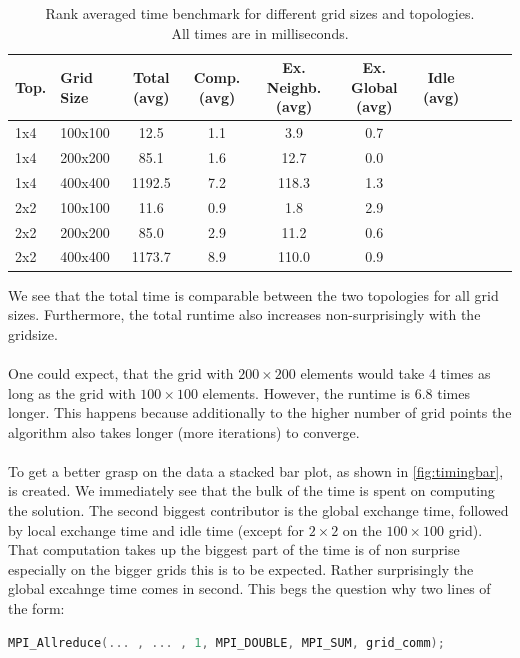\begin{table}[H]
    \centering
    \begin{tabular}{|l|l|c|c|c|c|c|c|c|c|}
        \hline
        Top. & Grid Size & Total (avg) & Comp. (avg) & Ex. Neighb. (avg) & Ex. Global (avg) & Idle (avg) \\\hline
        1x4 & 100x100 & 12.5 & 1.1 & 3.9 & 0.7 \\\hline
        1x4 & 200x200 & 85.1 & 1.6 & 12.7 & 0.0 \\\hline
        1x4 & 400x400 & 1192.5 & 7.2 & 118.3 & 1.3 \\\hline
        2x2 & 100x100 & 11.6 & 0.9 & 1.8 & 2.9 \\\hline
        2x2 & 200x200 & 85.0 & 2.9 & 11.2 & 0.6 \\\hline
        2x2 & 400x400 & 1173.7 & 8.9 & 110.0 & 0.9 \\\hline
    \end{tabular}
    \caption{Rank averaged time benchmark for different grid sizes and topologies.\\ All times are in milliseconds.}
    \label{tab:timing}
\end{table}
We see that the total time is comparable between the two topologies for all grid sizes. Furthermore, the total runtime also increases non-surprisingly with the gridsize. \\
\\
One could expect, that the grid with $200\times200$ elements would take 4 times as long as the grid with $100\times100$ elements. However, the runtime is 6.8 times longer. This happens because additionally to the higher number of grid points the algorithm also takes longer (more iterations) to converge. \\
\\
To get a better grasp on the data a stacked bar plot, as shown in \autoref{fig:timingbar}, is created. We immediately see that the bulk of the time is spent on computing the solution. The second biggest contributor is the global exchange time, followed by local exchange time and idle time (except for $2\times2$ on the $100\times100$ grid).\\
That computation takes up the biggest part of the time is of non surprise especially on the bigger grids this is to be expected. Rather surprisingly the global excahnge time comes in second. This begs the question why two lines of the form:
\begin{lstlisting}[language=c]
MPI_Allreduce(... , ... , 1, MPI_DOUBLE, MPI_SUM, grid_comm);
\end{lstlisting}
